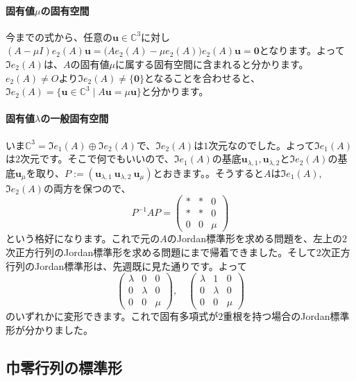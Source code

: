 
\paragraph{固有値$\mu$の固有空間}

今までの式から、任意の$\bm{u} \in \mathbb{C}^3$に対し$(A - \mu I) e_2(A) \bm{u} = \bigl(A e_2(A) - \mu e_2(A)\bigr) e_2(A) \bm{u} = \bm{0}$となります。よって$\Im e_2(A)$は、$A$の固有値$\mu$に属する固有空間に含まれると分かります。$e_2(A) \neq O$より$\Im e_2(A) \neq \{\bm{0}\}$となることを合わせると、$\Im e_2(A) = \{ \bm{u} \in \mathbb{C}^3 \mid A\bm{u} = \mu \bm{u}\}$と分かります。

\paragraph{固有値$\lambda$の一般固有空間}

いま$\mathbb{C}^3 = \Im e_1(A) \oplus \Im e_2(A)$で、$\Im e_2(A)$は$1$次元なのでした。よって$\Im e_1(A)$は$2$次元です。そこで何でもいいので、$\Im e_1(A)$の基底$\bm{u}_{\lambda, 1}, \bm{u}_{\lambda, 2}$と$\Im e_2(A)$の基底$\bm{u}_{\mu}$を取り、$P := (\bm{u}_{\lambda, 1}\ \bm{u}_{\lambda, 2}\ \bm{u}_{\mu})$とおきます。。そうすると$A$は$\Im e_1(A)$, $\Im e_2(A)$の両方を保つので、
\[
P^{-1} A P = 
\begin{pmatrix}
* & * & 0 \\
* & * & 0 \\
0 & 0 & \mu
\end{pmatrix}
\]
という格好になります。これで元の$A$のJordan標準形を求める問題を、左上の$2$次正方行列のJordan標準形を求める問題にまで帰着できました。そして$2$次正方行列のJordan標準形は、先週既に見た通りです。よって
\[
\begin{pmatrix}
\lambda & 0 & 0 \\
0 & \lambda & 0 \\
0 & 0 & \mu
\end{pmatrix}, \quad
\begin{pmatrix}
\lambda & 1 & 0 \\
0 & \lambda & 0 \\
0 & 0 & \mu
\end{pmatrix}
\]
のいずれかに変形できます。これで固有多項式が$2$重根を持つ場合のJordan標準形が分かりました。

\subsection{巾零行列の標準形}

